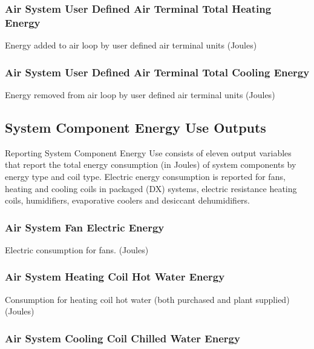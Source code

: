 \subsubsection{Air System User Defined Air Terminal Total Heating Energy}\label{air-system-user-defined-air-terminal-total-heating-energy}

Energy added to air loop by user defined air terminal units (Joules)

\subsubsection{Air System User Defined Air Terminal Total Cooling Energy}\label{air-system-user-defined-air-terminal-total-cooling-energy}

Energy removed from air loop by user defined air terminal units (Joules)

\subsection{System Component Energy Use Outputs}\label{system-component-energy-use-outputs}

Reporting System Component Energy Use consists of eleven output variables that report the total energy consumption (in Joules) of system components by energy type and coil type. Electric energy consumption is reported for fans, heating and cooling coils in packaged (DX) systems, electric resistance heating coils, humidifiers, evaporative coolers and desiccant dehumidifiers.

\subsubsection{Air System Fan Electric Energy}\label{air-system-fan-electric-energy}

Electric consumption for fans. (Joules)

\subsubsection{Air System Heating Coil Hot Water Energy}\label{air-system-heating-coil-hot-water-energy}

Consumption for heating coil hot water (both purchased and plant supplied) (Joules)

\subsubsection{Air System Cooling Coil Chilled Water Energy}\label{air-system-cooling-coil-chilled-water-energy}

